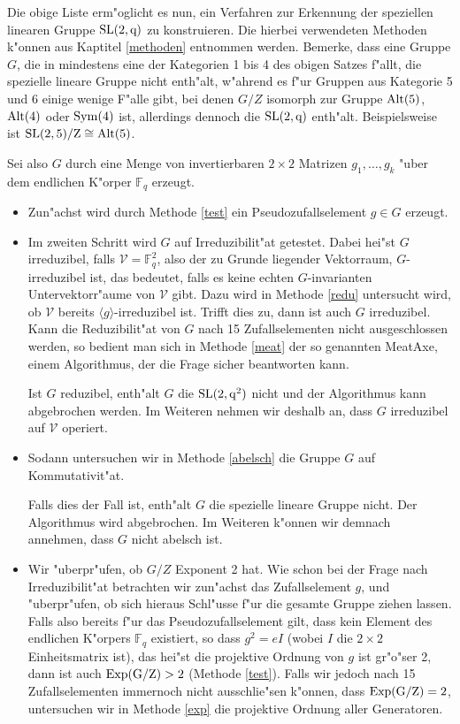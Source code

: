 \documentclass[a4paper,11pt]{article}
\theoremstyle{bla}
\begin{document}
Die obige Liste erm"oglicht es nun, ein Verfahren zur Erkennung der speziellen linearen Gruppe $\rm{SL}(2,q)$ zu konstruieren. Die hierbei verwendeten Methoden k"onnen aus Kaptitel \ref{methoden} entnommen werden.
Bemerke, dass eine Gruppe $G$, die in mindestens eine der Kategorien 1 bis 4 des obigen Satzes f"allt, die spezielle lineare Gruppe nicht enth"alt, w"ahrend es f"ur Gruppen aus Kategorie 5 und 6 einige wenige F"alle gibt, bei denen $G/Z$ isomorph zur Gruppe $\rm{Alt}(5)$, $\rm{Alt}(4)$ oder $\rm{Sym}(4)$ ist, allerdings dennoch die $\rm{SL}(2,q)$ enth"alt. Beispielsweise ist $\rm{SL}(2,5)/Z \cong \rm{Alt}(5)$.

Sei also $G$ durch eine Menge von invertierbaren $2 \times 2$ Matrizen $g_{1},\dots,g_{k}$ "uber dem endlichen K"orper $\mathbb{F}_{q}$ erzeugt.

 \begin{itemize}
  \item Zun"achst wird durch Methode \ref{test} ein Pseudozufallselement $g \in G$ erzeugt.

  \item Im zweiten Schritt wird $G$ auf Irreduzibilit"at getestet. Dabei hei"st $G$ irreduzibel, falls $\mathcal{V} = \mathbb{F}_{q}^{2}$, also der zu Grunde liegender Vektorraum, $G$-irreduzibel ist, das bedeutet, falls es keine echten $G$-invarianten Untervektorr"aume von $\mathcal{V}$ gibt. Dazu wird in Methode \ref{redu} untersucht wird, ob $\mathcal{V}$ bereits $\langle g \rangle$-irreduzibel ist. Trifft dies zu, dann ist auch $G$ irreduzibel. Kann die Reduzibilit"at von $G$ nach 15 Zufallselementen nicht ausgeschlossen werden, so bedient man sich in Methode \ref{meat} der so genannten MeatAxe, einem Algorithmus, der die Frage sicher beantworten kann.

  Ist $G$ reduzibel, enth"alt $G$ die $\rm{SL}(2,q^2)$ nicht und der Algorithmus kann abgebrochen werden. Im Weiteren nehmen wir deshalb an, dass $G$ irreduzibel auf $\mathcal{V}$ operiert.

  \item Sodann untersuchen wir in Methode \ref{abelsch} die Gruppe $G$ auf Kommutativit"at.

  Falls dies der Fall ist, enth"alt $G$ die spezielle lineare Gruppe nicht. Der Algorithmus wird abgebrochen. Im Weiteren k"onnen wir demnach annehmen, dass $G$ nicht abelsch ist.

  \item Wir "uberpr"ufen, ob $G/Z$ Exponent 2 hat. Wie schon bei der Frage nach Irreduzibilit"at betrachten wir zun"achst das Zufallselement $g$, und "uberpr"ufen, ob sich hieraus Schl"usse f"ur die gesamte Gruppe ziehen lassen. Falls also bereits f"ur das Pseudozufallselement gilt, dass kein Element des endlichen K"orpers $\mathbb{F}_{q}$ existiert, so dass $g^2 = eI$ (wobei $I$ die $2 \times 2$ Einheitsmatrix ist), das hei"st die projektive Ordnung von $g$ ist gr"o"ser 2, dann ist auch $\rm{Exp}(G/Z) > 2$ (Methode \ref{test}). Falls wir jedoch nach 15 Zufallselementen immernoch nicht ausschlie"sen k"onnen, dass $\rm{Exp}(G/Z) = 2$, untersuchen wir in Methode \ref{exp} die projektive Ordnung aller Generatoren.


\end{itemize}
\end{document}
